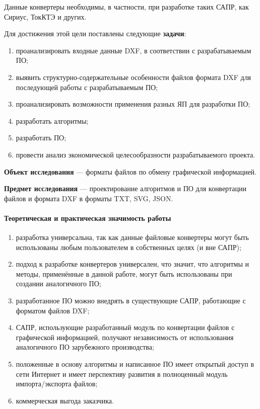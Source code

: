 Данные конвертеры необходимы, в частности, при разработке таких САПР, как Сириус, ТокКТЭ и других.

Для достижения этой цели поставлены следующие \textbf{задачи}:

\begin{enumerate}[1)]
	\item проанализировать входные данные DXF, в соответствии с разрабатываемым ПО;
	\item выявить структурно-содержательные особенности файлов формата DXF для последующей работы с разрабатываемым ПО;
	\item проанализировать возможности применения разных ЯП для разработки ПО;
	\item разработать алгоритмы;
	\item разработать ПО;
	\item провести анализ экономической целесообразности разрабатываемого проекта.
\end{enumerate}

\textbf{Объект исследования} --- форматы файлов по обмену графической информацией.

\textbf{Предмет исследования} --- проектирование алгоритмов и ПО для конвертации файлов и формата DXF в форматы TXT, SVG, JSON.

\paragraph{Теоретическая и практическая значимость работы}

\begin{enumerate}
	\item разработка универсальна, так как данные файловые конвертеры могут быть использованы любым пользователем в собственных целях (и вне САПР);
	\item подход к разработке конвертеров универсален, что значит, что алгоритмы и методы, применённые в данной работе, могут быть использованы при создании аналогичного ПО;
	\item разработанное ПО можно внедрять в существующие САПР, работающие с форматом файлов DXF;
	\item САПР, использующие разработанный модуль по конвертации файлов с графической информацией, получают независимость от использования аналогичного ПО зарубежного производства;
	\item положенные в основу алгоритмы и написанное ПО имеет открытый доступ в сети Интернет и имеет перспективу развития в полноценный модуль импорта/экспорта файлов;
	\item коммерческая выгода заказчика.
\end{enumerate}